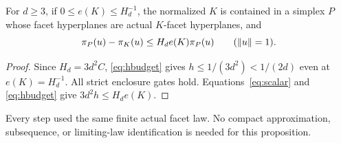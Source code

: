 \begin{proposition}\label{prop:enclosure}
For $d\ge3$, if $0\le e(K)\le H_d^{-1}$, the normalized $K$ is contained
in a simplex $P$ whose facet hyperplanes are actual $K$-facet hyperplanes,
and
\begin{equation}\label{eq:finalprojection}
 \pi_P(u)-\pi_K(u)\le H_de(K)\pi_P(u)\qquad(\lVert u\rVert=1).
\end{equation}
\end{proposition}
\begin{proof}
Since $H_d=3d^2C$, \eqref{eq:hbudget} gives
$h\le1/(3d^2)<1/(2d)$ even at $e(K)=H_d^{-1}$. All strict enclosure gates
hold. Equations~\eqref{eq:scalar} and \eqref{eq:hbudget} give
$3d^2h\le H_de(K)$.
\end{proof}
Every step used the same finite actual facet law. No compact approximation,
subsequence, or limiting-law identification is needed for this proposition.
